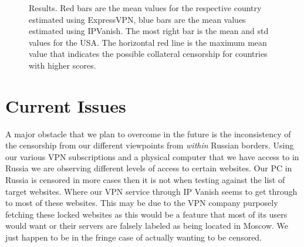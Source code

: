 \documentclass[conference]{IEEEtran}
\begin{document}
\begin{figure}
    \caption{Results. Red bars are the mean values for the respective country estimated using ExpressVPN, blue bars are the mean values estimated using IPVanish. The most right bar is the mean and std values for the USA. The horizontal red line is the maximum mean value that indicates the possible collateral censorship for countries with higher scores.}
    \label{fig:results}
\end{figure}

\section{Current Issues}

A major obstacle that we plan to overcome in the future is the inconsistency of the censorship from our different viewpoints from \textit{within} Russian borders.
Using our various VPN subscriptions and a physical computer that we have access to in Russia we are observing different levels of access to certain websites.
Our PC in Russia is censored in more cases then it is not when testing against the list of target websites.
Where our VPN service through IP Vanish seems to get through to most of these websites. 
This may be due to the VPN company purposely fetching these locked websites as this would be a feature that most of its users would want or their servers are falsely labeled as being located in Moscow. 
We just happen to be in the fringe case of actually wanting to be censored.
\end{document}
